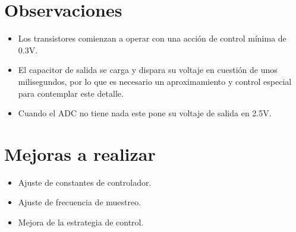 \section*{Observaciones}
\begin{itemize}
    \item Los transistores comienzan a operar con una acción de control mínima de 0.3V.
    \item El capacitor de salida se carga y dispara su voltaje en cuestión de unos milisegundos, por lo que es necesario un aproximamiento y control especial para contemplar este detalle.
    \item Cuando el ADC no tiene nada este pone su voltaje de salida en 2.5V.
\end{itemize}

\section*{Mejoras a realizar}
\begin{itemize}
    \item Ajuste de constantes de controlador.
    \item Ajuste de frecuencia de muestreo.
    \item Mejora de la estrategia de control.
\end{itemize}

